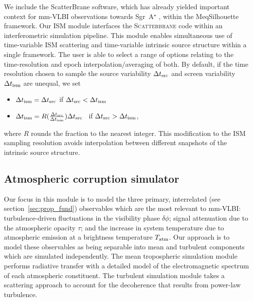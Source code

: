 We include the {\sc ScatterBrane} software, which has already yielded important context for mm-VLBI observations towards Sgr~A$^\star$ \citep[e.g.][]{2016arXiv160106571O}, within the {\sc MeqSilhouette} framework. Our ISM module interfaces the \textsc{Scatterbrane} code within an interferometric simulation pipeline. This module enables simultaneous use of time-variable ISM scattering and time-variable intrinsic source structure within a single framework. The user is able to select a range of options relating to the time-resolution and epoch interpolation/averaging of both. By default, if the time resolution chosen to sample the source variability $\Delta t_{\rm src}$ and screen variability $\Delta t_{\rm ism}$ are unequal, we set  
\begin{itemize}
 \setlength\itemsep{1em}
\item $\Delta t_{\rm ism}=\Delta t_{\rm src}$ \qquad \qquad if \qquad  $\Delta t_{\rm src} < \Delta t_{\rm ism}$
\item $\Delta t_{\rm ism}=R(\frac{\Delta t_{\rm src}}{\Delta t_{\rm ism}})\Delta t_{\rm src}$ \ if \qquad  $\Delta t_{\rm src} > \Delta t_{\rm ism}$,
\end{itemize}
where $R$ rounds the fraction to the nearest integer.  This modification to the ISM sampling resolution avoids interpolation between different snapshots of the intrinsic source structure.


\subsection{Atmospheric corruption simulator}\label{sec:trop_imp}

Our focus in this module is to model the three primary, interrelated (see section~\ref{sec:prop_fund}) observables which are the most relevant to mm-VLBI: turbulence-driven fluctuations in the visibility phase $\delta \phi$; signal attenuation due to the atmospheric opacity $\tau$; and the increase in system temperature due to atmospheric emission at a brightness temperature $T_{\rm atm}$. Our approach is to model these observables as being separable into mean and turbulent components which are simulated independently. The mean tropospheric simulation module performs radiative transfer with a detailed model of the electromagnetic spectrum of each atmospheric constituent. The turbulent simulation module takes a scattering approach to account for the decoherence that results from power-law turbulence.

